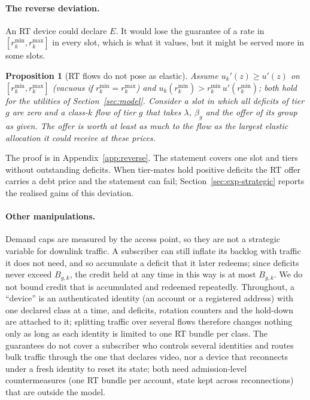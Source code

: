 \documentclass[preprint,11pt]{elsarticle}
\newtheorem{proposition}{Proposition}
\theoremstyle{definition}
\theoremstyle{remark}
\newcommand{\rmin}{r^{\min}}
\newcommand{\rmax}{r^{\max}}
\begin{document}
\paragraph{The reverse deviation.}
An RT device could declare $E$.
It would lose the guarantee of a rate in $[\rmin_k,\rmax_k]$ in every slot, which is what it values, but it might be served more in some slots.

\begin{proposition}[RT flows do not pose as elastic]\label{prop:reverse}
Assume $u_k'(z)\ge u'(z)$ on $[\rmin_k,\rmax_k]$ (vacuous if $\rmin_k=\rmax_k$) and $u_k(\rmin_k)>\rmin_k\,u'(\rmin_k)$; both hold for the utilities of Section~\ref{sec:model}.
Consider a slot in which all deficits of tier $g$ are zero and a class-$k$ flow of tier $g$ that takes $\lambda$, $\beta_g$ and the offer of its group as given.
The offer is worth at least as much to the flow as the largest elastic allocation it could receive at these prices.
\end{proposition}

The proof is in Appendix~\ref{app:reverse}.
The statement covers one slot and tiers without outstanding deficits.
When tier-mates hold positive deficits the RT offer carries a debt price and the statement can fail; Section~\ref{sec:exp-strategic} reports the realised gains of this deviation.

\paragraph{Other manipulations.}
Demand caps are measured by the access point, so they are not a strategic variable for downlink traffic.
A subscriber can still inflate its backlog with traffic it does not need, and so accumulate a deficit that it later redeems; since deficits never exceed $B_{g,k}$, the credit held at any time in this way is at most $B_{g,k}$. We do not bound credit that is accumulated and redeemed repeatedly.
Throughout, a ``device'' is an authenticated identity (an account or a registered address) with one declared class at a time, and deficits, rotation counters and the hold-down are attached to it; splitting traffic over several flows therefore changes nothing only as long as each identity is limited to one RT bundle per class.
The guarantees do not cover a subscriber who controls several identities and routes bulk traffic through the one that declares video, nor a device that reconnects under a fresh identity to reset its state; both need admission-level countermeasures (one RT bundle per account, state kept across reconnections) that are outside the model.
\end{document}
